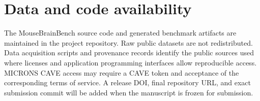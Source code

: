 \section{Data and code availability}

The MouseBrainBench source code and generated benchmark artifacts are maintained
in the project repository. Raw public datasets are not redistributed. Data
acquisition scripts and provenance records identify the public sources used
where licenses and application programming interfaces allow reproducible access.
MICRONS CAVE access may require a CAVE token and acceptance of the corresponding
terms of service. A release DOI, final repository URL, and exact submission
commit will be added when the manuscript is frozen for submission.
